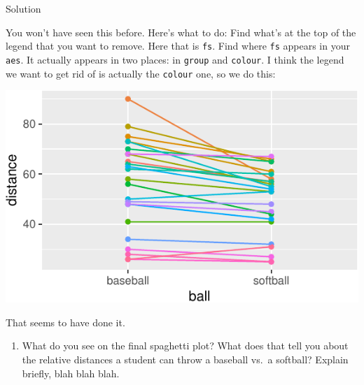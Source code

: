 \documentclass[]{tufte-book}
\newenvironment{Shaded}{}{}
\newcommand{\DataTypeTok}[1]{\textcolor[rgb]{0.56,0.13,0.00}{#1}}
\newcommand{\KeywordTok}[1]{\textcolor[rgb]{0.00,0.44,0.13}{\textbf{#1}}}
\newcommand{\NormalTok}[1]{#1}
\newcommand{\OperatorTok}[1]{\textcolor[rgb]{0.40,0.40,0.40}{#1}}
\newcommand{\StringTok}[1]{\textcolor[rgb]{0.25,0.44,0.63}{#1}}
\providecommand{\tightlist}{%
  \setlength{\itemsep}{0pt}\setlength{\parskip}{0pt}}
\theoremstyle{definition}
\theoremstyle{definition}
\theoremstyle{definition}
\theoremstyle{remark}
\begin{document}
Solution

You won't have seen this before. Here's what to do: Find what's at the
top of the legend that you want to remove. Here that is \texttt{fs}.
Find where \texttt{fs} appears in your \texttt{aes}. It actually appears
in two places: in \texttt{group} and \texttt{colour}. I think the legend
we want to get rid of is actually the \texttt{colour} one, so we do
this:

\begin{Shaded}
\end{Shaded}

\includegraphics{11-tidying-and-selecting-data_files/figure-latex/unnamed-chunk-21-1}

That seems to have done it.

\begin{enumerate}
\def\labelenumi{(\alph{enumi})}
\setcounter{enumi}{6}
\tightlist
\item
  What do you see on the final spaghetti plot? What does that tell you
  about the relative distances a student can throw a baseball vs.~a
  softball? Explain briefly, blah blah blah.
\end{enumerate}
\end{document}
